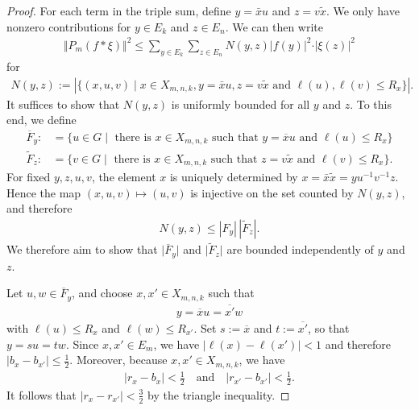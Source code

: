 \documentclass[10pt,a4paper]{amsart}
\begin{document}
\begin{proof}
    For each term in the triple sum, define $y = \bar{x}u$ and $z = v\tilde{x}$. We only have nonzero contributions for $y \in E_k$ and $z \in E_n$. 
    We can then write
    \begin{align}\label{eq:multiplicity-convolution-bound-Nyz}
        \Vert P_m (f*\xi) \Vert^2 \leq  \sum_{y \in E_k} \sum_{z \in E_n} N(y,z) \vert f(y) \vert^2 \cdot \vert \xi(z) \vert^2
    \end{align}
    for
    \begin{align*}
        N(y,z) := |\{(x,u,v) \mid x \in X_{m,n,k}, y = \bar{x}u, z= v\tilde{x}\text{ and } \ell(u),\ell(v) \leq R_x \}|.
    \end{align*}
    It suffices to show that $N(y,z)$ is uniformly bounded for all $y$ and $z$. To this end, we define
    \begin{align*}
        \overline{F}_y :&= \{ u \in G \mid  \text{  there is $x \in X_{m,n,k}$ such that $y = \overline{x}u$} \text{ and } \ell(u) \leq R_x \} \\
        \tilde{F}_z :&=  \{ v \in G \mid  \text{  there is $x \in X_{m,n,k}$ such that $z = v\tilde{x}$ and $\ell(v) \leq R_x$} \}.
    \end{align*}
    For fixed $y,z,u,v$, the element $x$ is uniquely determined by $x=\bar x\widetilde x
=yu^{-1}v^{-1}z$.
Hence the map
$(x,u,v)\mapsto (u,v)$ 
is injective on the set counted by $N(y,z)$, and therefore
\begin{align*}
    N(y,z)\leq |F_y|\,|\widetilde F_z|.
\end{align*}  
    We therefore aim to show that $\vert \overline{F}_y \vert $ and $\vert \tilde{F}_z \vert$ are bounded independently of $y$ and $z$. 


    Let $u,w \in \overline{F}_y$, and choose $x,x' \in X_{m,n,k}$ such that
    \begin{align*}
        y = \overline{x}u = \overline{x'}w
    \end{align*}
    with $\ell(u) \leq R_x$ and $\ell(w) \leq R_{x'}$. Set $s:= \overline{x}$ and $t:= \overline{x'}$, so that $y = su = tw$. Since $x,x' \in E_m$, we have
    $\vert \ell(x) - \ell(x') \vert < 1$ and therefore $\vert b_x - b_{x'} \vert \leq \frac{1}{2}$. Moreover, because $x,x' \in X_{m,n,k}$, we have
    \begin{align*}
        \vert r_x - b_x \vert < \frac{1}{2} \quad \text{and} \quad \vert r_{x'} - b_{x'} \vert < \frac{1}{2}.
    \end{align*}
    It follows that $\vert r_x - r_{x'}\vert < \frac{3}{2}$ by the triangle inequality. 
    

\end{proof}
\end{document}
